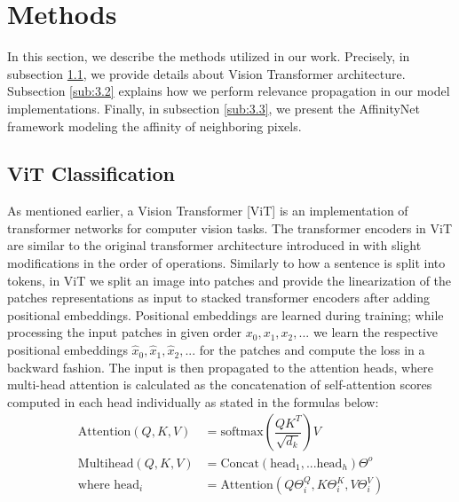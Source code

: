 \documentclass{article}
\begin{document}


\section{Methods}

In this section, we describe the methods utilized in our work. Precisely, in subsection \ref{sub:3.1}, we provide details about Vision Transformer architecture. Subsection \ref{sub:3.2} explains how we perform relevance propagation in our model implementations. Finally, in subsection \ref{sub:3.3}, we present the AffinityNet framework modeling the affinity of neighboring pixels.


\subsection{ViT Classification}
\label{sub:3.1}
As mentioned earlier, a Vision Transformer [ViT] \cite{visiontransformer} is an implementation of transformer networks for computer vision tasks. The transformer encoders in ViT are similar to the original transformer architecture introduced in \cite{vaswani2017attention} with slight modifications in the order of operations. Similarly to how a sentence is split into tokens, in ViT we split an image into patches and provide the linearization of the patches representations as input to stacked transformer encoders after adding positional embeddings. Positional embeddings are learned during training; while processing the input patches in given order $x_0, x_1, x_2, ...$ we learn the respective positional embeddings $\hat{x}_0, \hat{x}_1, \hat{x}_2, ...$ for the patches and compute the loss in a backward fashion. The input is then propagated to the attention heads, where multi-head attention is calculated as the concatenation of self-attention scores computed in each head individually as stated in the formulas below:
\begin{align*}
\text{Attention}(Q, K, V) &= \text{softmax}\left(\dfrac{QK^T}{\sqrt{d_k}}\right)V\\
\text{Multihead}(Q, K, V) &= \text{Concat}(\text{head}_1,...\text{head}_h)\Theta^o \\
\text{where head}_i &= \text{Attention}(Q\Theta_i^Q, K\Theta_i^K, V\Theta_i^V)
\end{align*}
\end{document}
